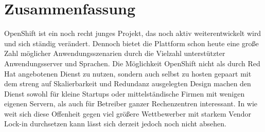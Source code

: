 \documentclass[10pt,a4paper,compsoc]{IEEEtran}
\begin{document}
\section{Zusammenfassung}
\label{sec:sum}
OpenShift ist ein noch recht junges Projekt, das noch aktiv weiterentwickelt wird und sich ständig verändert. Dennoch bietet die Plattform schon heute eine große Zahl möglicher Anwendungsszenarien durch die Vielzahl unterstützter Anwendungsserver und Sprachen. Die Möglichkeit OpenShift nicht als durch Red Hat angebotenen Dienst zu nutzen, sondern auch selbst zu hosten gepaart mit dem streng auf Skalierbarkeit und Redundanz ausgelegten Design machen den Dienst sowohl für kleine Startups oder mittelständische Firmen mit wenigen eigenen Servern, als auch für Betreiber ganzer Rechenzentren interessant. In wie weit sich diese Offenheit gegen viel größere Wettbewerber mit starkem Vendor Lock-in durchsetzen kann lässt sich derzeit jedoch noch nicht absehen.



\end{document}
